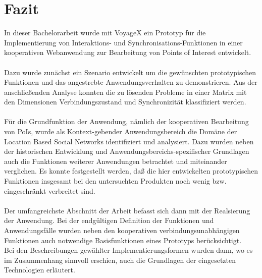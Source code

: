 \newpage
%
%
\section{Fazit}
In dieser Bachelorarbeit wurde mit VoyageX ein Prototyp für die Implementierung von Interaktions- und Synchronisations-Funktionen in einer kooperativen Webanwendung zur Bearbeitung von Points of Interest entwickelt.\\ \\
Dazu wurde zunächst ein Szenario entwickelt um die gewünschten prototypischen Funktionen und das angestrebte Anwendungsverhalten zu demonstrieren. Aus der anschließenden Analyse konnten die zu lösenden Probleme in einer Matrix mit den Dimensionen Verbindungszustand und Synchronizität klassifiziert werden.\\ \\
Für die Grundfunktion der Anwendung, nämlich der kooperativen Bearbeitung von PoIs, wurde als Kontext-gebender Anwendungsbereich die Domäne der Location Based Social Networks identifiziert und analysiert. Dazu wurden neben der historischen Entwicklung und Anwendungsbereichs-spezifischer Grundlagen auch die Funktionen weiterer Anwendungen betrachtet und miteinander verglichen.
Es konnte festgestellt werden, daß die hier entwickelten prototypischen Funktionen insgesamt bei den untersuchten Produkten noch wenig bzw. eingeschränkt verbreitet sind.\\ \\
Der umfangreichste Abschnitt der Arbeit befasst sich dann mit der Realsierung der Anwendung. Bei der endgültigen Definition der Funktionen und Anwendungsfälle wurden neben den kooperativen verbindungsunabhängigen Funktionen auch notwendige Basisfunktionen eines Prototyps berücksichtigt.\\
Bei den Beschreibungen gewählter Implementierungsformen wurden dann, wo es im Zusammenhang sinnvoll erschien, auch die Grundlagen der eingesetzten Technologien erläutert. 
